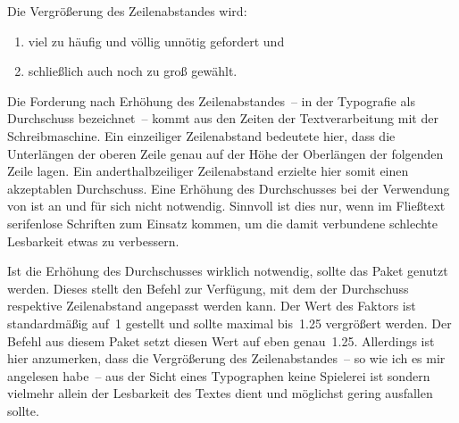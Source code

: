 \begin{DeclarePackages}
  Die Vergrößerung des Zeilenabstandes wird:
  \begin{enumerate}[itemindent=0pt,labelwidth=*,labelsep=1em,label=\Roman*.]
  \item viel zu häufig und völlig unnötig gefordert und
  \item schließlich auch noch zu groß gewählt.
  \end{enumerate}
  Die Forderung nach Erhöhung des Zeilenabstandes~-- in der Typografie als 
  Durchschuss bezeichnet~-- kommt aus den Zeiten der Textverarbeitung mit der 
  Schreibmaschine. Ein einzeiliger Zeilenabstand bedeutete hier, dass die 
  Unterlängen der oberen Zeile genau auf der Höhe der Oberlängen der folgenden 
  Zeile lagen. Ein anderthalbzeiliger Zeilenabstand erzielte hier somit einen 
  akzeptablen Durchschuss. Eine Erhöhung des Durchschusses bei der Verwendung 
  von  ist an und für sich nicht notwendig. Sinnvoll ist dies 
  nur, wenn im Fließtext serifenlose Schriften zum Einsatz kommen, um die damit 
  verbundene schlechte Lesbarkeit etwas zu verbessern.
  
  Ist die Erhöhung des Durchschusses wirklich notwendig, sollte das Paket 
   genutzt werden. Dieses stellt den Befehl 
   zur Verfügung, mit dem der Durchschuss 
  respektive Zeilenabstand angepasst werden kann. Der Wert des Faktors ist 
  standardmäßig auf~1 gestellt und sollte maximal bis~1.25 vergrößert werden. 
  Der Befehl  aus diesem Paket setzt diesen Wert auf 
  eben genau~1.25. Allerdings ist hier anzumerken, dass die Vergrößerung des 
  Zeilenabstandes~-- so wie ich es mir angelesen habe~-- aus der Sicht eines 
  Typographen keine Spielerei ist sondern vielmehr allein der Lesbarkeit des 
  Textes dient und möglichst gering ausfallen sollte.
  

\end{DeclarePackages}
